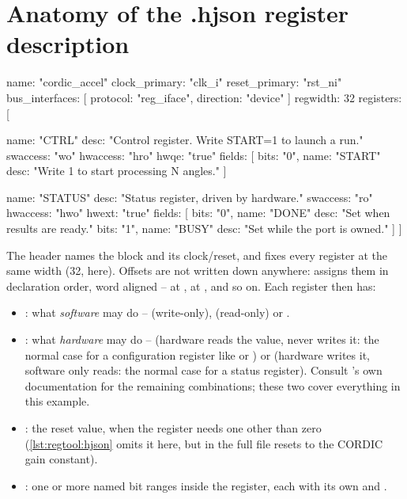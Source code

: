\section{Anatomy of the .hjson register description}

\begin{corecode}[caption={data/cordic\_accel.hjson (trimmed to two registers)},label={lst:regtool:hjson}]
{ name: "cordic_accel"
  clock_primary: "clk_i"
  reset_primary: "rst_ni"
  bus_interfaces: [
    { protocol: "reg_iface", direction: "device" }
  ]
  regwidth: 32
  registers: [

    { name:     "CTRL"
      desc:     "Control register. Write START=1 to launch a run."
      swaccess: "wo"
      hwaccess: "hro"
      hwqe:     "true"
      fields: [
        { bits: "0", name: "START"
          desc: "Write 1 to start processing N angles."
        }
      ]
    }

    { name:     "STATUS"
      desc:     "Status register, driven by hardware."
      swaccess: "ro"
      hwaccess: "hwo"
      hwext:    "true"
      fields: [
        { bits: "0", name: "DONE" desc: "Set when results are ready." }
        { bits: "1", name: "BUSY" desc: "Set while the port is owned." }
      ]
    }
  ]
}
\end{corecode}

The header names the block and its clock/reset, and  fixes
every register at the same width (32, here). Offsets are not written down
anywhere:  assigns them in declaration order, word aligned --
 at ,  at , and so on. Each
register then has:

\begin{itemize}
  \item {}: what \emph{software} may do -- 
        (write-only),  (read-only) or .
  \item {}: what \emph{hardware} may do --  (hardware
        reads the value, never writes it: the normal case for a
        configuration register like  or ) or 
        (hardware writes it, software only reads: the normal case for a
        status register). Consult 's own documentation for
        the remaining combinations; these two cover everything in this
        example.
  \item {}: the reset value, when the register needs one other
        than zero (\cref{lst:regtool:hjson} omits it here, but
         in the full file resets to the CORDIC gain constant).
  \item {}: one or more named bit ranges inside the register,
        each with its own  and .
\end{itemize}

